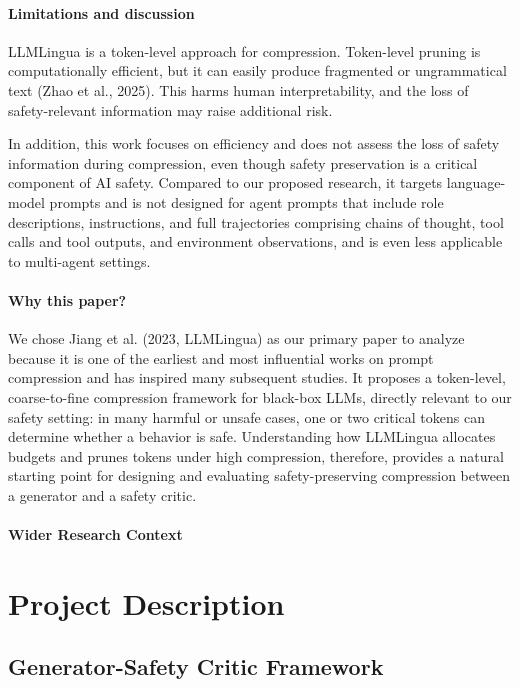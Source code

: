 \documentclass[11pt]{article}
\newcommand{\todo}[1]{\textcolor{orange}{[TODO: #1]}}
\begin{document}
\paragraph{Limitations and discussion}LLMLingua is a token-level approach for compression. Token-level pruning is computationally efficient, but it can easily produce fragmented or ungrammatical text (Zhao et al., 2025). This harms human interpretability, and the loss of safety-relevant information may raise additional risk.

In addition, this work focuses on efficiency and does not assess the loss of safety information during compression, even though safety preservation is a critical component of AI safety. Compared to our proposed research, it targets language-model prompts and is not designed for agent prompts that include role descriptions, instructions, and full trajectories comprising chains of thought, tool calls and tool outputs, and environment observations, and is even less applicable to multi-agent settings.



\paragraph{Why this paper?} We chose Jiang et al. (2023, LLMLingua) as our primary paper to analyze because it is one of the earliest and most influential works on prompt compression and has inspired many subsequent studies. It proposes a token-level, coarse-to-fine compression framework for black-box LLMs, directly relevant to our safety setting: in many harmful or unsafe cases, one or two critical tokens can determine whether a behavior is safe. Understanding how LLMLingua allocates budgets and prunes tokens under high compression, therefore, provides a natural starting point for designing and evaluating safety-preserving compression between a generator and a safety critic.


\paragraph{Wider Research Context}

\section{Project Description}
\subsection{Generator-Safety Critic Framework}
\end{document}
